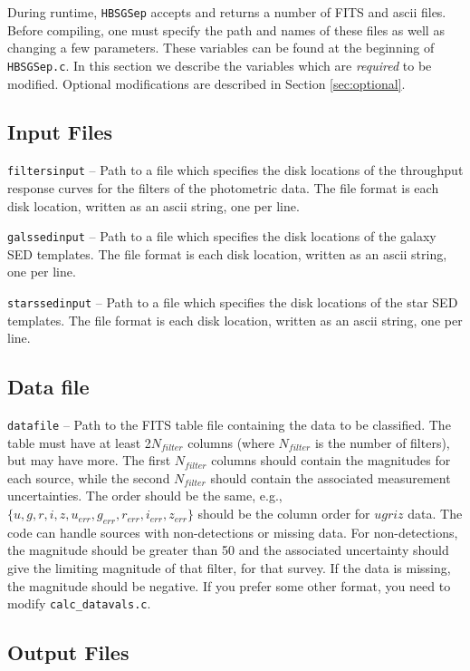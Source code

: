 \documentclass[12pt,preprint]{aastex}
\begin{document}
During runtime, {\tt HBSGSep} accepts and returns a number of FITS and ascii files.  
Before compiling, one must specify the path and names of these files as well as 
changing a few parameters.  These variables can be found at the beginning of 
{\tt HBSGSep.c}.  In this section we describe the variables which are \emph{required} 
to be modified.  Optional modifications are described in Section \ref{sec:optional}.

\subsection{Input Files}

{\tt filtersinput} -- Path to a file which specifies the disk locations of the throughput 
response curves for the filters of the photometric data.  The file format is each 
disk location, written as an ascii string, one per line.

{\tt galssedinput} -- Path to a file which specifies the disk locations of the galaxy SED 
templates.  The file format is each disk location, written as an ascii string, one per line.

{\tt starssedinput} -- Path to a file which specifies the disk locations of the star SED 
templates.  The file format is each disk location, written as an ascii string, one per line.

\subsection{Data file}

{\tt datafile} -- Path to the FITS table file containing the data to be classified.  The table 
must have at least 2$N_{filter}$ columns (where $N_{filter}$ is the number of filters), but may have 
more.  The first $N_{filter}$ columns should contain the magnitudes for each source, while 
the second $N_{filter}$ should contain the associated measurement uncertainties.  The order 
should be the same, e.g., $\{u,g,r,i,z,u_{err},g_{err},r_{err},i_{err},z_{err}\}$ should be the 
column order for $ugriz$ data.  The code can handle sources with non-detections or 
missing data.  For non-detections, the magnitude should be greater than 50 and the 
associated uncertainty should give the limiting magnitude of that filter, for that survey.  
If the data is missing, the magnitude should be negative.  If you prefer some other 
format, you need to modify {\tt calc\_datavals.c}.

\subsection{Output Files}
\end{document}
